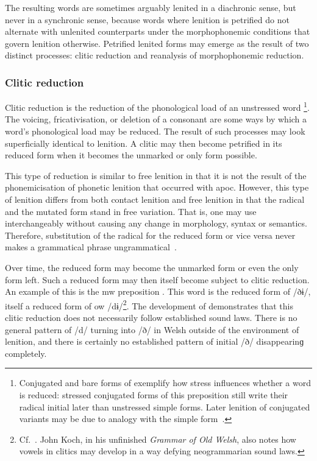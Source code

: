 The resulting words are sometimes  arguably lenited in a diachronic sense, but never in a synchronic sense, because words where lenition is petrified do not alternate with unlenited counterparts under the morphophonemic conditions that  govern lenition otherwise. Petrified lenited forms may emerge as the result of two distinct processes: clitic reduction and reanalysis of morphophonemic reduction.

\subsubsection{Clitic reduction}
\label{sec:clitic-reduction}
Clitic reduction is the reduction of the phonological load of an unstressed word%
\footnote{Conjugated and bare forms of  exemplify how stress influences whether a word is reduced: stressed conjugated forms of this preposition still write their radical initial later than unstressed simple forms. Later lenition of conjugated variants may be due to analogy with the simple form~\autocite[54]{jongeleen_lenition_2016}.}. 
The voicing, fricativisation, or deletion of a consonant are some ways by which a word's phonological load may be reduced.
The result of such processes may look superficially identical to lenition.
A clitic may then become petrified in its reduced form when it becomes the unmarked or only form possible. 

This type of reduction is similar to free lenition in that it is not the result of the phonemicisation of phonetic lenition that occurred with \gls{apoc}.
However, this type of lenition differs from both contact lenition and free lenition in that the radical and the mutated form stand in free variation.
That is, one may use  interchangeably without causing any change in morphology, syntax or semantics. 
Therefore, substitution of the radical for the reduced form or vice versa never makes a grammatical phrase ungrammatical~\autocite[451--453]{morgan_y_1952}. 

Over time, the reduced form may become the unmarked form or even the only form left. 
Such a reduced form may then itself become subject to clitic reduction. 
An example of this is the \gls{mw} preposition . 
This word is the reduced form of  /ðɨ/, itself a reduced form of \gls{ow}  /dɨ/\footnote{Cf.\ . John Koch, in his unfinished \emph{Grammar of Old Welsh}, also notes how vowels in clitics may develop in a way defying neogrammarian sound laws.}. 
The development of  demonstrates that this clitic reduction does not necessarily follow established sound laws. 
There is no general pattern of /d/ turning into /ð/ in Welsh outside of the environment of lenition, and there is certainly no established pattern of initial /ð/ disappearinɡ completely.

